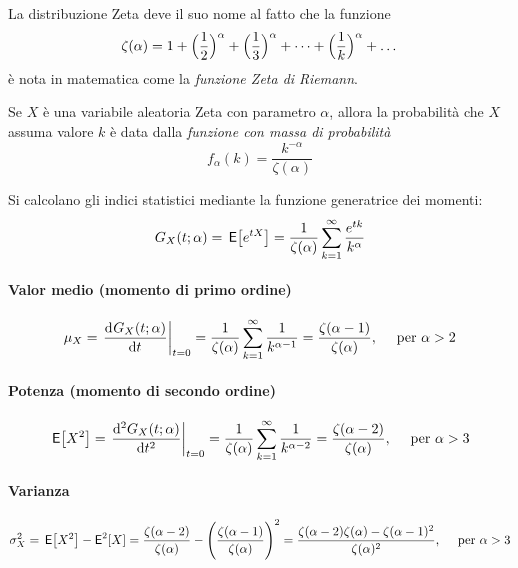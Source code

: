 La distribuzione Zeta deve il suo nome al fatto che la funzione
\[
	\zeta(\alpha) = 1 + \Bigl(\frac{1}{2}\Bigr)^\alpha + \Bigl(\frac{1}{3}\Bigr)^\alpha + \dots + \Bigl(\frac{1}{k}\Bigr)^\alpha + \dots
\]
è nota in matematica come la \emph{funzione Zeta di Riemann}.

Se \(X\) è una variabile aleatoria Zeta con parametro \(\alpha\), allora la probabilità
che \(X\) assuma valore \(k\) è data dalla \emph{funzione con massa di probabilità}
\begin{equation}
	f_\alpha(k) = \frac{k^{-\alpha}}{\zeta(\alpha)}
\end{equation}

Si calcolano gli indici statistici mediante la funzione generatrice dei momenti:
\begin{equation}
	G_X(t;\alpha) = \,{\operatorname{\mathsf{E}}}\!\left[{e^{tX}}\right] = \frac{1}{\zeta(\alpha)} \sum_{k=1}^\infty \frac{e^{tk}}{k^{\alpha}}
\end{equation}

\paragraph{Valor medio (momento di primo ordine)}
\begin{equation}
	\mu_X = \left.{\dfrac{\mathop{}\!\mathrm{d}^{}G_X(t;\alpha)}{\mathop{}\!\mathrm{d} t^{}}}\right\rvert_{t=0} =
	\frac{1}{\zeta(\alpha)} \sum_{k=1}^\infty \frac{1}{k^{\alpha-1}} =
	\frac{\zeta(\alpha-1)}{\zeta(\alpha)},
	\quad \text{ per } \alpha > 2
\end{equation}

\paragraph{Potenza (momento di secondo ordine)}
\begin{equation}
	\,{\operatorname{\mathsf{E}}}\!\left[{X^2}\right] = \left.{\frac{\mathrm{d}^2 G_X(t;\alpha)}{\mathrm{d}t^2}}\right\rvert_{t=0} =
	\frac{1}{\zeta(\alpha)} \sum_{k=1}^\infty \frac{1}{k^{\alpha -2}} =
	\frac{\zeta(\alpha -2)}{\zeta(\alpha)},
	\quad \text{ per } \alpha > 3
\end{equation}

\paragraph{Varianza}
\begin{equation}
	\sigma_X^2 = \,{\operatorname{\mathsf{E}}}\!\left[{X^2}\right] - \operatorname{\mathsf{E}}^2[X] =
	\frac{\zeta(\alpha -2)}{\zeta(\alpha)} - \Biggl(\frac{\zeta(\alpha-1)}{\zeta(\alpha)}\Biggr)^2 =
	\frac{\zeta(\alpha-2)\zeta(\alpha) - \zeta(\alpha-1)^2}{\zeta(\alpha)^2},
	\quad \text{ per } \alpha > 3
\end{equation}

